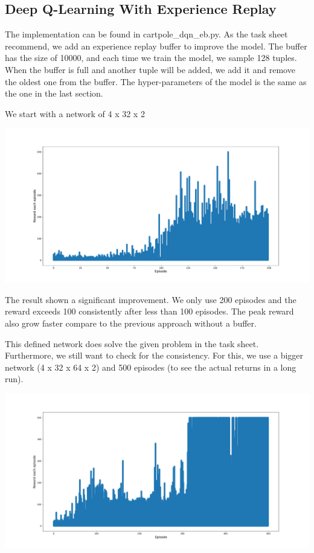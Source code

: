 \documentclass[11pt]{article}
\begin{document}
\subsection{Deep Q-Learning With Experience Replay}

The implementation can be found in cartpole\_dqn\_eb.py. As the task sheet recommend, we add an experience replay buffer to improve the model. The buffer has the size of 10000, and each time we train the model, we sample 128 tuples. When the buffer is full and another tuple will be added, we add it and remove the oldest one from the buffer. The hyper-parameters of the model is the same as the one in the last section.

We start with a network of 4 x 32 x 2

\includegraphics[width=\textwidth,height=\textheight,keepaspectratio]{figures/dqn_buffer.pdf}

The result shown a significant improvement. We only use 200 episodes and the reward exceeds 100 consistently after less than 100 episodes. The peak reward also grow faster compare to the previous approach without a buffer.

This defined network does solve the given problem in the task sheet. Furthermore, we still want to check for the consistency. For this, we use a bigger network (4 x 32 x 64 x 2) and 500 episodes (to see the actual returns in a long run).

\includegraphics[width=\textwidth,height=\textheight,keepaspectratio]{figures/dqn_buffer2.png}
\end{document}
